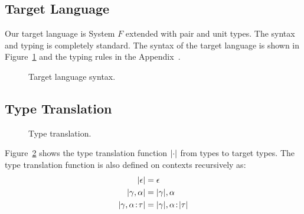 

\subsection{Target Language}

Our target language is System $F$ extended with pair and unit types. The syntax
and typing is completely standard. The syntax of the target language is shown in
Figure~\ref{fig:f-syntax} and the typing rules in the Appendix~.
\begin{figure}[h]
  
  \caption{Target language syntax.}
  \label{fig:f-syntax}
\end{figure}



\subsection{Type Translation}

\begin{figure}[h]

\caption{Type translation.}
\label{fig:type-translation}
\end{figure}

Figure~\ref{fig:type-translation} shows the type translation function
$\lvert \cdot \rvert$ from \name types to target types. The type translation function is
also defined on \name contexts recursively as:
\begin{align*}
\lvert \epsilon \rvert                    &= \epsilon \\
\lvert \gamma, \alpha \rvert            &= \lvert \gamma \rvert, \alpha \\
\lvert \gamma, \alpha \!:\! \tau \rvert &= \lvert \gamma \rvert, \alpha \!:\! \lvert \tau \rvert
\end{align*}


